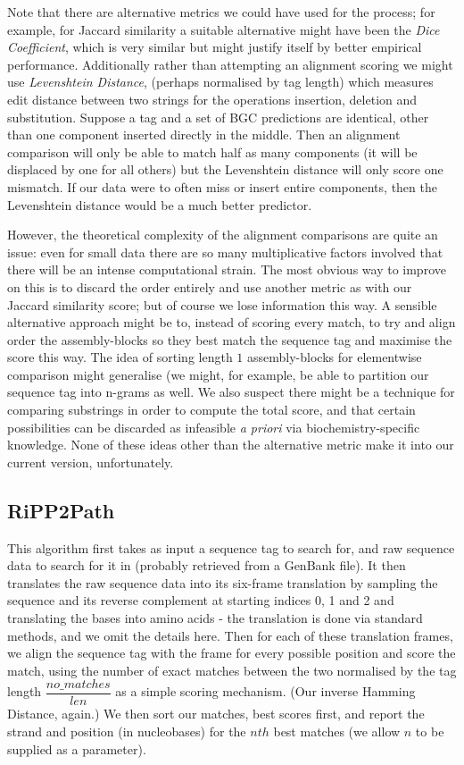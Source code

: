 \documentclass{l4proj}
\newcommand{\cit}[1]{\citep{#1}}
\begin{document}
Note that there are alternative metrics we could have used for the process; for example, for Jaccard similarity a suitable alternative might have been the \textit{Dice Coefficient}, \cit{Dice} which is very similar but might justify itself by better empirical performance. Additionally rather than attempting an alignment scoring we might use \textit{Levenshtein Distance}, \cit{levenshtein} (perhaps normalised by tag length) which measures edit distance between two strings for the operations insertion, deletion and substitution. Suppose a tag and a set of BGC predictions are identical, other than one component inserted directly in the middle. Then an alignment comparison will only be able to match half as many components (it will be displaced by one for all others) but the Levenshtein distance will only score one mismatch. If our data were to often miss or insert entire components, then the Levenshtein distance would be a much better predictor.

However, the theoretical complexity of the alignment comparisons are quite an issue: even for small data there are so many multiplicative factors involved that there will be an intense computational strain. The most obvious way to improve on this is to discard the order entirely and use another metric as with our Jaccard similarity score; but of course we lose information this way. A sensible alternative approach might be to, instead of scoring every match, to try and align order the assembly-blocks so they best match the sequence tag and maximise the score this way. The idea of sorting length \(1\) assembly-blocks for elementwise comparison might generalise (we might, for example, be able to partition our sequence tag into n-grams as well. We also suspect there might be a technique for comparing substrings in order to compute the total score, and that certain possibilities can be discarded as infeasible \textit{a priori} via biochemistry-specific knowledge. None of these ideas other than the alternative metric make it into our current version, unfortunately.

\subsection{RiPP2Path}

This algorithm first takes as input a sequence tag to search for, and raw sequence data to search for it in (probably retrieved from a GenBank file). It then translates the raw sequence data into its six-frame translation by sampling the sequence and its reverse complement at starting indices 0, 1 and 2 and translating the bases into amino acids - the translation is done via standard methods, and we omit the details here. Then for each of these translation frames, we align the sequence tag with the frame for every possible position and score the match, using the number of exact matches between the two normalised by the tag length \(\dfrac{no\_matches}{len}\) as a simple scoring mechanism. (Our inverse Hamming Distance, again.) We then sort our matches, best scores first, and report the strand and position (in nucleobases) for the \(nth\) best matches (we allow \(n\) to be supplied as a parameter). 
\end{document}
